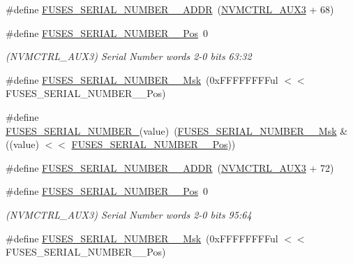 \begin{DoxyCompactItemize}
\item 
\#define \mbox{\hyperlink{group__fuses__api_ga717d606e31f8614e3c9174d297809ac4}{F\+U\+S\+E\+S\+\_\+\+S\+E\+R\+I\+A\+L\+\_\+\+N\+U\+M\+B\+E\+R\+\_\+\_\+\+A\+D\+DR}}~(\mbox{\hyperlink{group___s_a_m_d21_j16_b__base_ga478afec83ff525e3abb7dfb5ca699f18}{N\+V\+M\+C\+T\+R\+L\+\_\+\+A\+U\+X3}} + 68)
\item 
\#define \mbox{\hyperlink{group__fuses__api_ga5793e6245ef927d38ff79952666e2063}{F\+U\+S\+E\+S\+\_\+\+S\+E\+R\+I\+A\+L\+\_\+\+N\+U\+M\+B\+E\+R\+\_\+\_\+\+Pos}}~0
\begin{DoxyCompactList}\small\item\em (N\+V\+M\+C\+T\+R\+L\+\_\+\+A\+U\+X3) Serial Number words 2-\/0 bits 63\+:32 \end{DoxyCompactList}\item 
\#define \mbox{\hyperlink{group__fuses__api_gae414ca2007ce94bfef1663be9e7c8b2b}{F\+U\+S\+E\+S\+\_\+\+S\+E\+R\+I\+A\+L\+\_\+\+N\+U\+M\+B\+E\+R\+\_\+\_\+\+Msk}}~(0x\+F\+F\+F\+F\+F\+F\+F\+Ful $<$$<$ F\+U\+S\+E\+S\+\_\+\+S\+E\+R\+I\+A\+L\+\_\+\+N\+U\+M\+B\+E\+R\+\_\+\_\+\+Pos)
\item 
\#define \mbox{\hyperlink{group__fuses__api_gafc9cac3d68076b925a1a0943d6bdbbdc}{F\+U\+S\+E\+S\+\_\+\+S\+E\+R\+I\+A\+L\+\_\+\+N\+U\+M\+B\+E\+R\+\_}}(value)~(\mbox{\hyperlink{group__fuses__api_gae414ca2007ce94bfef1663be9e7c8b2b}{F\+U\+S\+E\+S\+\_\+\+S\+E\+R\+I\+A\+L\+\_\+\+N\+U\+M\+B\+E\+R\+\_\+\_\+\+Msk}} \& ((value) $<$$<$ \mbox{\hyperlink{group__fuses__api_ga5793e6245ef927d38ff79952666e2063}{F\+U\+S\+E\+S\+\_\+\+S\+E\+R\+I\+A\+L\+\_\+\+N\+U\+M\+B\+E\+R\+\_\+\_\+\+Pos}}))
\item 
\#define \mbox{\hyperlink{group__fuses__api_gac3a705a7da6459e37e75421cee5c5b43}{F\+U\+S\+E\+S\+\_\+\+S\+E\+R\+I\+A\+L\+\_\+\+N\+U\+M\+B\+E\+R\+\_\+\_\+\+A\+D\+DR}}~(\mbox{\hyperlink{group___s_a_m_d21_j16_b__base_ga478afec83ff525e3abb7dfb5ca699f18}{N\+V\+M\+C\+T\+R\+L\+\_\+\+A\+U\+X3}} + 72)
\item 
\#define \mbox{\hyperlink{group__fuses__api_gaab5e97f22331115f7b80c7edb94a7b1f}{F\+U\+S\+E\+S\+\_\+\+S\+E\+R\+I\+A\+L\+\_\+\+N\+U\+M\+B\+E\+R\+\_\+\_\+\+Pos}}~0
\begin{DoxyCompactList}\small\item\em (N\+V\+M\+C\+T\+R\+L\+\_\+\+A\+U\+X3) Serial Number words 2-\/0 bits 95\+:64 \end{DoxyCompactList}\item 
\#define \mbox{\hyperlink{group__fuses__api_gac9b9e353eaf5b7cab2b5c3182aa437e3}{F\+U\+S\+E\+S\+\_\+\+S\+E\+R\+I\+A\+L\+\_\+\+N\+U\+M\+B\+E\+R\+\_\+\_\+\+Msk}}~(0x\+F\+F\+F\+F\+F\+F\+F\+Ful $<$$<$ F\+U\+S\+E\+S\+\_\+\+S\+E\+R\+I\+A\+L\+\_\+\+N\+U\+M\+B\+E\+R\+\_\+\_\+\+Pos)
$$
\end{DoxyCompactItemize}

